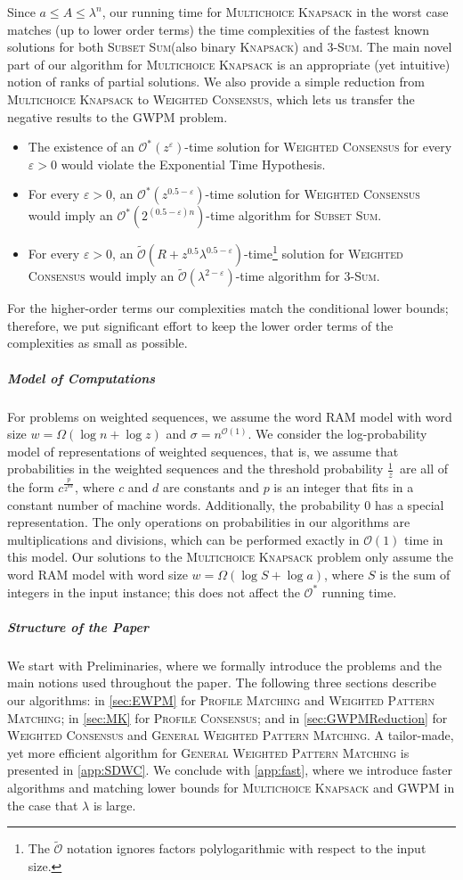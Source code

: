 \documentclass{article}
\theoremstyle{plain}
\theoremstyle{definition}
\newcommand{\MK}{\textsc{Multichoice Knapsack}\xspace}
\newcommand{\PM}{\textsc{Profile Matching}\xspace}
\newcommand{\WPM}{\textsc{Weighted Pattern Matching}\xspace}
\newcommand{\GWPM}{\textsc{GWPM}\xspace}
\newcommand{\GWPMFull}{\textsc{General Weighted Pattern Matching}\xspace}
\newcommand{\WC}{\textsc{Weighted Consensus}\xspace}
\newcommand{\PC}{\textsc{Profile Consensus}\xspace}
\newcommand{\Knapsack}{\textsc{Knapsack}\xspace}
\newcommand{\SubsetSum}{\textsc{Subset Sum}\xspace}
\newcommand{\Sum}{\textsc{Sum}\xspace}
\newcommand{\Oh}{\mathcal{O}}
\newcommand{\Ohtilde}{\tilde{\mathcal{O}}}
\newcommand{\fr}{\ensuremath{\frac1z}}
\begin{document}
  Since $a \le A \le \lambda^n$, our running time for \MK in the worst case matches (up to lower order terms) the time complexities of the fastest known solutions
  for both \SubsetSum (also binary \Knapsack) and 3-\Sum. 
  The main novel part of our algorithm for \MK is an appropriate (yet intuitive) notion of ranks of partial solutions.
  We also provide a simple reduction from \MK to \WC, which lets us transfer the negative results to the \GWPM problem.
  \begin{itemize}
    \item The existence of an $\Oh^*(z^{\varepsilon})$-time solution for \WC for every $\varepsilon>0$  would violate the Exponential Time Hypothesis.
    \item For every $\varepsilon>0$, an $\Oh^*(z^{0.5-\varepsilon})$-time solution for \WC would imply an $\Oh^*(2^{(0.5 -\varepsilon)n})$-time algorithm for \SubsetSum.
    \item For every $\varepsilon>0$, an $\Ohtilde(R+z^{0.5}\lambda^{0.5-\varepsilon})$-time\footnote{
      The $\Ohtilde$ notation ignores factors polylogarithmic with respect to the input size.
    } solution for \WC would imply an $\Ohtilde(\lambda^{2-\varepsilon})$-time algorithm for 3-\Sum.
  \end{itemize}
  For the higher-order terms our complexities match the conditional lower bounds;
  therefore, we put significant effort to keep the lower order terms of the complexities
  as small as possible.

  \subparagraph*{Model of Computations}
  For problems on weighted sequences, we assume the word RAM model with word size $w = \Omega(\log n + \log z)$ and $\sigma = n^{\Oh(1)}$.
We consider the log-probability model of representations of weighted sequences, that is, we assume that
  probabilities in the weighted sequences and the threshold probability \fr\ are all of the form $c^{\frac{p}{2^{dw}}}$,
  where $c$ and $d$ are constants and $p$ is an integer that fits in a constant number of machine words.
  Additionally, the probability 0 has a special representation.
  The only operations on probabilities in our algorithms are multiplications and divisions, which can be
  performed exactly in $\Oh(1)$ time in this model.
  Our solutions to the \MK problem only assume the word RAM model with word size $w=\Omega(\log S+\log a)$,
  where $S$ is the sum of integers in the input instance; this does not affect the $\Oh^*$ running time.

  \subparagraph*{Structure of the Paper}
  We start with Preliminaries, where we formally introduce the problems and the main notions used throughout the paper.
  The following three sections describe our algorithms: in \cref{sec:EWPM} for \PM and \WPM;
  in \cref{sec:MK} for \PC; and in \cref{sec:GWPMReduction} for \WC and \GWPMFull.
  A tailor-made, yet more efficient algorithm for \GWPMFull is presented in \cref{app:SDWC}.
  We conclude with \cref{app:fast}, where we introduce faster algorithms and matching lower bounds
  for \MK and \GWPM in the case that $\lambda$ is large.
\end{document}
